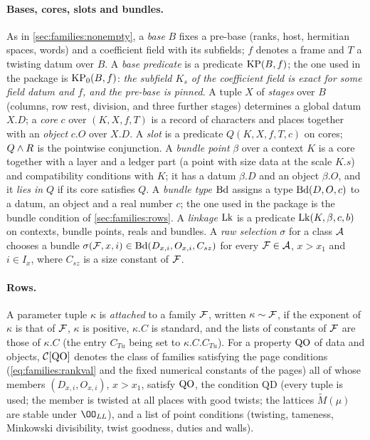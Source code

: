 \paragraph{Bases, cores, slots and bundles.}
As in \cref{sec:families:nonempty}, a \emph{base} $B$ fixes a pre-base (ranks, host, hermitian spaces, words) and a
coefficient field with its subfields; $f$ denotes a frame and $T$ a twisting datum over $B$. A \emph{base predicate} is a
predicate $\mathrm{KP}(B,f)$; the one used in the package is $\mathrm{KP}_0(B,f)$: \emph{the subfield $K_s$ of the
coefficient field is exact for some field datum and $f$, and the pre-base is pinned}. A tuple $X$ of \emph{stages} over $B$
(columns, row rest, division, and three further stages) determines a global datum $X.D$; a \emph{core} $c$ over
$(K,X,f,T)$ is a record of characters and places together with an \emph{object} $c.O$ over $X.D$. A \emph{slot} is a
predicate $Q(K,X,f,T,c)$ on cores; $Q\mathbin{\wedge} R$ is the pointwise conjunction. A \emph{bundle point} $\beta$ over a
context $K$ is a core together with a layer and a ledger part (a point with size data at the scale $K.s$) and
compatibility conditions with $K$; it has a datum $\beta.D$ and an object $\beta.O$, and it \emph{lies in} $Q$ if its core
satisfies $Q$. A \emph{bundle type} $\mathrm{Bd}$ assigns a type $\mathrm{Bd}(D,O,c)$ to a datum, an object and a real
number $c$; the one used in the package is the bundle condition of \cref{sec:families:rows}. A \emph{linkage}
$\mathrm{Lk}$ is a predicate $\mathrm{Lk}(K,\beta,c,b)$ on contexts, bundle points, reals and bundles. A \emph{raw selection}
$\sigma$ for a class $\mathcal{A}$ chooses a bundle $\sigma(\mathcal{F},x,i)\in\mathrm{Bd}(D_{x,i},O_{x,i},C_{sz})$ for every
$\mathcal{F}\in\mathcal{A}$, $x>x_1$ and $i\in I_x$, where $C_{sz}$ is a size constant of $\mathcal{F}$.

\paragraph{Rows.}
A parameter tuple $\kappa$ is \emph{attached} to a family $\mathcal{F}$, written $\kappa\sim\mathcal{F}$, if the exponent of
$\kappa$ is that of $\mathcal{F}$, $\kappa$ is positive, $\kappa.C$ is standard, and the lists of constants of $\mathcal{F}$ are
those of $\kappa.C$ (the entry $C_{Tu}$ being set to $\kappa.C.C_{Tu}$). For a property $\mathrm{QO}$ of data and objects,
$\mathcal{C}[\mathrm{QO}]$ denotes the class of families satisfying the page conditions (\cref{eq:families:rankval} and the
fixed numerical constants of the pages) all of whose members $(D_{x,i},O_{x,i})$, $x>x_1$, satisfy $\mathrm{QO}$, the
condition $\mathrm{QD}$ (every tuple is used; the member is twisted at all places with good twists; the lattices
$\widetilde M(\mu)$ are stable under $\OO_{\mathit{LL}}$), and a list of point conditions (twisting, tameness, Minkowski
divisibility, twist goodness, duties and walls).

